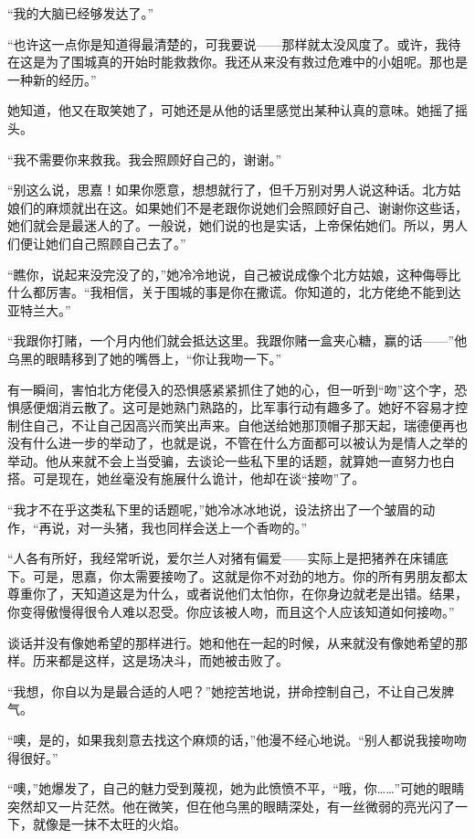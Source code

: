 \par “我的大脑已经够发达了。”
\par “也许这一点你是知道得最清楚的，可我要说——那样就太没风度了。或许，我待在这是为了围城真的开始时能救救你。我还从来没有救过危难中的小姐呢。那也是一种新的经历。”
\par 她知道，他又在取笑她了，可她还是从他的话里感觉出某种认真的意味。她摇了摇头。
\par “我不需要你来救我。我会照顾好自己的，谢谢。”
\par “别这么说，思嘉！如果你愿意，想想就行了，但千万别对男人说这种话。北方姑娘们的麻烦就出在这。如果她们不是老跟你说她们会照顾好自己、谢谢你这些话，她们就会是最迷人的了。一般说，她们说的也是实话，上帝保佑她们。所以，男人们便让她们自己照顾自己去了。”
\par “瞧你，说起来没完没了的，”她冷冷地说，自己被说成像个北方姑娘，这种侮辱比什么都厉害。“我相信，关于围城的事是你在撒谎。你知道的，北方佬绝不能到达亚特兰大。”
\par “我跟你打赌，一个月内他们就会抵达这里。我跟你赌一盒夹心糖，赢的话——”他乌黑的眼睛移到了她的嘴唇上，“你让我吻一下。”
\par 有一瞬间，害怕北方佬侵入的恐惧感紧紧抓住了她的心，但一听到“吻”这个字，恐惧感便烟消云散了。这可是她熟门熟路的，比军事行动有趣多了。她好不容易才控制住自己，不让自己因高兴而笑出声来。自他送给她那顶帽子那天起，瑞德便再也没有什么进一步的举动了，也就是说，不管在什么方面都可以被认为是情人之举的举动。他从来就不会上当受骗，去谈论一些私下里的话题，就算她一直努力也白搭。可是现在，她丝毫没有施展什么诡计，他却在谈“接吻”了。
\par “我才不在乎这类私下里的话题呢，”她冷冰冰地说，设法挤出了一个皱眉的动作，“再说，对一头猪，我也同样会送上一个香吻的。”
\par “人各有所好，我经常听说，爱尔兰人对猪有偏爱——实际上是把猪养在床铺底下。可是，思嘉，你太需要接吻了。这就是你不对劲的地方。你的所有男朋友都太尊重你了，天知道这是为什么，或者说他们太怕你，在你身边就老是出错。结果，你变得傲慢得很令人难以忍受。你应该被人吻，而且这个人应该知道如何接吻。”
\par 谈话并没有像她希望的那样进行。她和他在一起的时候，从来就没有像她希望的那样。历来都是这样，这是场决斗，而她被击败了。
\par “我想，你自以为是最合适的人吧？”她挖苦地说，拼命控制自己，不让自己发脾气。
\par “噢，是的，如果我刻意去找这个麻烦的话，”他漫不经心地说。“别人都说我接吻吻得很好。”
\par “噢，”她爆发了，自己的魅力受到蔑视，她为此愤愤不平，“哦，你……”可她的眼睛突然却又一片茫然。他在微笑，但在他乌黑的眼睛深处，有一丝微弱的亮光闪了一下，就像是一抹不太旺的火焰。
